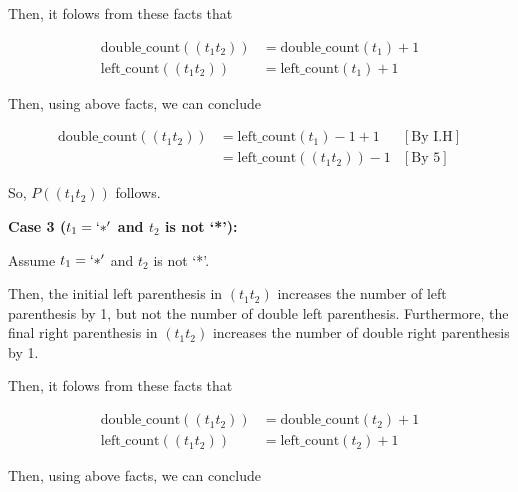 \documentclass[12pt]{article}
\begin{document}
\begin{enumerate}[a.]
\begin{mdframed}
        \bigskip

        Then, it folows from these facts that
        \color{black}

        \bigskip

        \begin{align}
            \text{double\_count}((t_1t_2)) &= \text{double\_count}(t_1) + 1\\
            \text{left\_count}((t_1t_2)) &= \text{left\_count}(t_1) + 1
        \end{align}

        \bigskip

        Then, using above facts, we can conclude

        \begin{align}
            \text{double\_count}((t_1t_2)) &= \text{left\_count}(t_1) - 1 + 1 & [\text{By I.H}]\\
            &= \text{left\_count}((t_1t_2)) - 1 & [\text{By 5}]
        \end{align}

        \bigskip

        So, $P((t_1t_2))$ follows.

        \bigskip

        \textbf{Case 3 ($t_1 = `*'$ and $t_2$ is not `*'):}

        \bigskip

        Assume $t_1 = `*'$ and $t_2$ is not `*'.

        \bigskip

        \color{red}Then, the initial left parenthesis in $(t_1t_2)$ increases
        the number of left parenthesis by 1, but not the number of double left parenthesis.
        Furthermore, the final right parenthesis in $(t_1t_2)$ increases the number
        of double right parenthesis by 1.

        \bigskip

        Then, it folows from these facts that
        \color{black}

        \bigskip

        \begin{align}
            \text{double\_count}((t_1t_2)) &= \text{double\_count}(t_2) + 1\\
            \text{left\_count}((t_1t_2)) &= \text{left\_count}(t_2) + 1
        \end{align}

        \bigskip

        Then, using above facts, we can conclude


\end{mdframed}
\end{enumerate}
\end{document}
